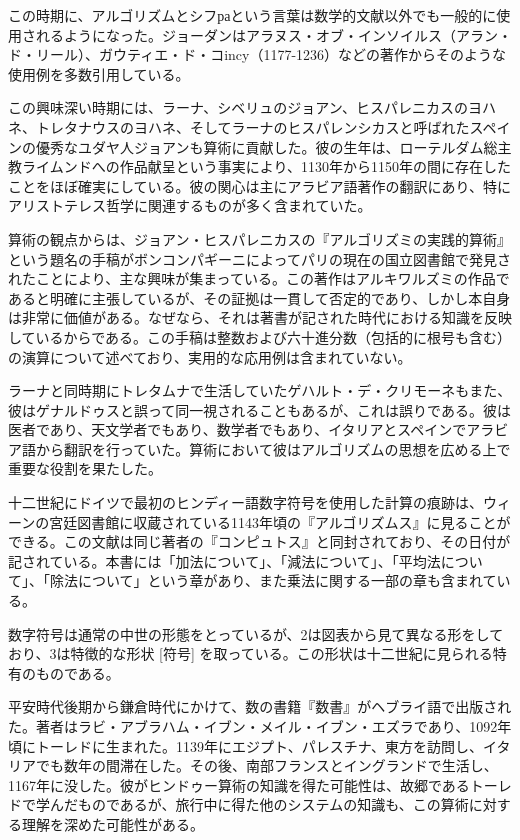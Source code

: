 \documentclass[a4paper,11pt,openany]{ltjsbook}
\begin{document}
この時期に、アルゴリズムとシフраという言葉は数学的文献以外でも一般的に使用されるようになった。ジョーダンはアラヌス・オブ・インソイルス（アラン・ド・リール）、ガウティエ・ド・コincy（1177-1236）などの著作からそのような使用例を多数引用している。

この興味深い時期には、ラーナ、シベリュのジョアン、ヒスパレニカスのヨハネ、トレタナウスのヨハネ、そしてラーナのヒスパレンシカスと呼ばれたスペインの優秀なユダヤ人ジョアンも算術に貢献した。彼の生年は、ローテルダム総主教ライムンドへの作品献呈という事実により、1130年から1150年の間に存在したことをほぼ確実にしている。彼の関心は主にアラビア語著作の翻訳にあり、特にアリストテレス哲学に関連するものが多く含まれていた。

算術の観点からは、ジョアン・ヒスパレニカスの『アルゴリズミの実践的算術』という題名の手稿がボンコンパギーニによってパリの現在の国立図書館で発見されたことにより、主な興味が集まっている。この著作はアルキワルズミの作品であると明確に主張しているが、その証拠は一貫して否定的であり、しかし本自身は非常に価値がある。なぜなら、それは著書が記された時代における知識を反映しているからである。この手稿は整数および六十進分数（包括的に根号も含む）の演算について述べており、実用的な応用例は含まれていない。

ラーナと同時期にトレタムナで生活していたゲハルト・デ・クリモーネもまた、彼はゲナルドゥスと誤って同一視されることもあるが、これは誤りである。彼は医者であり、天文学者でもあり、数学者でもあり、イタリアとスペインでアラビア語から翻訳を行っていた。算術において彼はアルゴリズムの思想を広める上で重要な役割を果たした。

十二世紀にドイツで最初のヒンディー語数字符号を使用した計算の痕跡は、ウィーンの宮廷図書館に収蔵されている1143年頃の『アルゴリズムス』に見ることができる。この文献は同じ著者の『コンピュトス』と同封されており、その日付が記されている。本書には「加法について」、「減法について」、「平均法について」、「除法について」という章があり、また乗法に関する一部の章も含まれている。

数字符号は通常の中世の形態をとっているが、2は図表から見て異なる形をしており、3は特徴的な形状 [符号] を取っている。この形状は十二世紀に見られる特有のものである。

平安時代後期から鎌倉時代にかけて、数の書籍『数書』がヘブライ語で出版された。著者はラビ・アブラハム・イブン・メイル・イブン・エズラであり、1092年頃にトーレドに生まれた。1139年にエジプト、パレスチナ、東方を訪問し、イタリアでも数年の間滞在した。その後、南部フランスとイングランドで生活し、1167年に没した。彼がヒンドゥー算術の知識を得た可能性は、故郷であるトーレドで学んだものであるが、旅行中に得た他のシステムの知識も、この算術に対する理解を深めた可能性がある。
\end{document}
